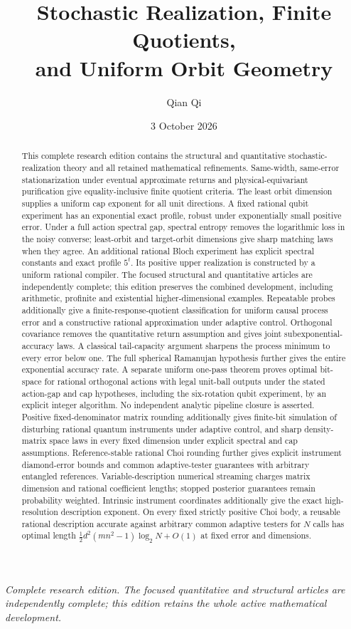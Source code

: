 \documentclass[11pt]{amsart}
\title[Stochastic realization and orbit geometry]{Stochastic Realization, Finite Quotients,\\and Uniform Orbit Geometry}
\author{Qian Qi}
\date{3 October 2026}
\numberwithin{equation}{section}
\theoremstyle{definition}\newtheorem{definition}[theorem]{Definition}
\theoremstyle{remark}\newtheorem{remark}[theorem]{Remark}
\begin{document}
\raggedbottom
\begin{abstract}
This complete research edition contains the structural and quantitative
stochastic-realization theory and all retained mathematical refinements.
Same-width, same-error stationarization under eventual approximate returns
and physical-equivariant purification give equality-inclusive finite
quotient criteria. The least orbit dimension supplies a uniform cap
exponent for all unit directions. A fixed rational qubit experiment has
an exponential exact profile, robust under exponentially small positive
error. Under a full action spectral gap, spectral entropy removes the logarithmic loss in the noisy
converse; least-orbit and target-orbit dimensions give sharp matching
laws when they agree. An additional rational Bloch experiment has
explicit spectral constants and exact profile $5^t$. Its positive upper realization is constructed by a uniform
rational compiler. The focused structural and quantitative articles are
independently complete; this edition preserves the combined development,
including arithmetic, profinite and existential higher-dimensional
examples. Repeatable probes additionally give a finite-response-quotient
classification for uniform causal process error and a constructive
rational approximation under adaptive control. Orthogonal covariance removes the quantitative return assumption and
gives joint subexponential-accuracy laws. A classical tail-capacity
argument sharpens the process minimum to every error below one.
The full spherical Ramanujan hypothesis further gives the entire
exponential accuracy rate. A separate uniform one-pass theorem proves
optimal bit-space for rational orthogonal actions with legal unit-ball
outputs under the stated action-gap and cap hypotheses, including the
six-rotation qubit experiment, by an explicit
integer algorithm. No independent analytic pipeline closure is asserted.
Positive fixed-denominator matrix rounding additionally gives
finite-bit simulation of disturbing rational quantum instruments
under adaptive control, and sharp density-matrix space laws in every
fixed dimension under explicit spectral and cap assumptions.
Reference-stable rational Choi rounding further gives explicit
instrument diamond-error bounds and common adaptive-tester guarantees
with arbitrary entangled references. Variable-description numerical
streaming charges matrix dimension and rational coefficient lengths;
stopped posterior guarantees remain probability weighted.
Intrinsic instrument coordinates additionally give the exact
high-resolution description exponent. On every fixed strictly positive
Choi body, a reusable rational description accurate against arbitrary
common adaptive testers for $N$ calls has optimal length
$\tfrac12d^2(mn^2-1)\log_2N+O(1)$ at fixed error and dimensions.
\end{abstract}
\maketitle
\noindent\textit{Complete research edition. The focused quantitative and structural articles are independently complete; this edition retains the whole active mathematical development.}
\end{document}
